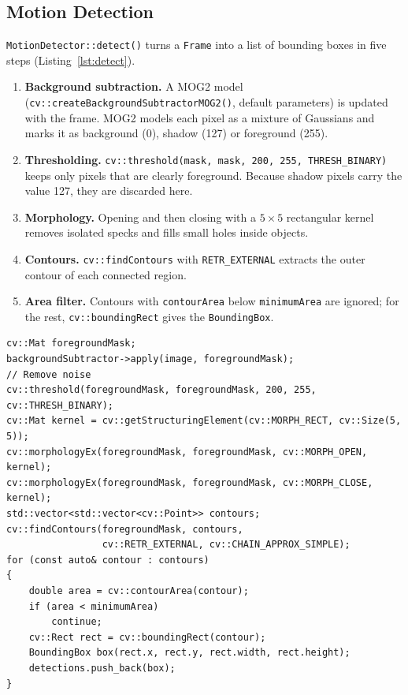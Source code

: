 \documentclass[12pt,a4paper,oneside]{book}
\begin{document}
\subsection{Motion Detection}
\texttt{MotionDetector::detect()} turns a \texttt{Frame} into a list of bounding boxes in five steps (Listing~\ref{lst:detect}).
\begin{enumerate}
    \item \textbf{Background subtraction.} A MOG2 model (\texttt{cv::\allowbreak createBackground\allowbreak SubtractorMOG2()}, default parameters) is updated with the frame. MOG2 models each pixel as a mixture of Gaussians and marks it as background (0), shadow (127) or foreground (255).
    \item \textbf{Thresholding.} \texttt{cv::threshold(mask, mask, 200, 255, THRESH\_BINARY)} keeps only pixels that are clearly foreground. Because shadow pixels carry the value 127, they are discarded here.
    \item \textbf{Morphology.} Opening and then closing with a $5\times5$ rectangular kernel removes isolated specks and fills small holes inside objects.
    \item \textbf{Contours.} \texttt{cv::findContours} with \texttt{RETR\_EXTERNAL} extracts the outer contour of each connected region.
    \item \textbf{Area filter.} Contours with \texttt{contourArea} below \texttt{minimumArea} are ignored; for the rest, \texttt{cv::boundingRect} gives the \texttt{BoundingBox}.
\end{enumerate}

\begin{minipage}{\linewidth}
\begin{lstlisting}[caption={\texttt{MotionDetector::detect()} (core of the method).}, label={lst:detect}]
cv::Mat foregroundMask;
backgroundSubtractor->apply(image, foregroundMask);
// Remove noise
cv::threshold(foregroundMask, foregroundMask, 200, 255, cv::THRESH_BINARY);
cv::Mat kernel = cv::getStructuringElement(cv::MORPH_RECT, cv::Size(5, 5));
cv::morphologyEx(foregroundMask, foregroundMask, cv::MORPH_OPEN, kernel);
cv::morphologyEx(foregroundMask, foregroundMask, cv::MORPH_CLOSE, kernel);
std::vector<std::vector<cv::Point>> contours;
cv::findContours(foregroundMask, contours,
                 cv::RETR_EXTERNAL, cv::CHAIN_APPROX_SIMPLE);
for (const auto& contour : contours)
{
    double area = cv::contourArea(contour);
    if (area < minimumArea)
        continue;
    cv::Rect rect = cv::boundingRect(contour);
    BoundingBox box(rect.x, rect.y, rect.width, rect.height);
    detections.push_back(box);
}
\end{lstlisting}
\end{minipage}
\end{document}
